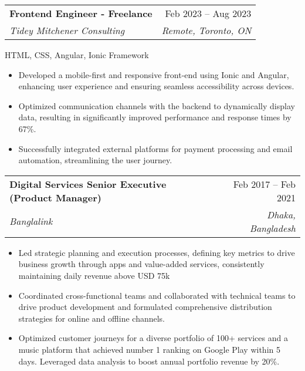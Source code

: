 \documentclass[letterpaper,11pt]{article}
\makeatletter
\newcommand{\resumeItem}[1]{
  \item\small{
    {#1 \vspace{-2pt}}
  }
}
\newcommand{\resumeSubheading}[4]{
  \vspace{-2pt}\item
    \begin{tabular*}{0.97\textwidth}[t]{l@{\extracolsep{\fill}}r}
      \textbf{#1} & #2 \\
      \textit{\small#3} & \textit{\small #4} \\
    \end{tabular*}\vspace{-7pt}
}
\newcommand{\resumeItemListStart}{\begin{itemize}}
\newcommand{\resumeItemListEnd}{\end{itemize}\vspace{-5pt}}
\makeatother
\begin{document}
     \vspace{4pt}
    \resumeSubheading
      {Frontend Engineer - Freelance}{Feb 2023 -- Aug 2023}
      {Tidey Mitchener Consulting}{Remote, Toronto, ON}
    \begin{itemize}[leftmargin=0, label={}]
        \small{\item{
         {HTML, CSS, Angular, Ionic Framework} \\
        }}
    \end{itemize}
     \vspace{4pt}
      \resumeItemListStart
        \resumeItem{Developed a mobile-first and responsive front-end using Ionic and Angular, enhancing user experience and ensuring seamless accessibility across devices.}
        \resumeItem{Optimized communication channels with the backend to dynamically display data, resulting in significantly improved performance and response times by 67\%.}
        \resumeItem{Successfully integrated external platforms for payment processing and email automation, streamlining the user journey.}
      \resumeItemListEnd

     \vspace{4pt}
    \resumeSubheading
      {Digital Services Senior Executive (Product Manager)}{Feb 2017 – Feb 2021}
      {Banglalink}{Dhaka, Bangladesh}
       \vspace{4pt}
      \resumeItemListStart
        \resumeItem{Led strategic planning and execution processes, defining key metrics to drive business growth through apps and value-added services, consistently maintaining daily revenue above USD 75k}
        \resumeItem{Coordinated cross-functional teams and collaborated with technical teams to drive product development and formulated comprehensive distribution strategies for online and offline channels.}
        \resumeItem{Optimized customer journeys for a diverse portfolio of 100+ services and a music platform that achieved number 1 ranking on Google Play within 5 days. Leveraged data analysis to boost annual portfolio revenue by 20\%.}
    \resumeItemListEnd
\end{document}
